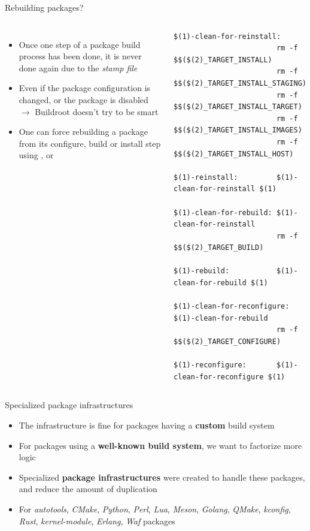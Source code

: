 \begin{frame}[fragile]{Rebuilding packages?}
  \begin{columns}
  \begin{itemize}
  \item Once one step of a package build process has been done, it is
    never done again due to the {\em stamp file}
  \item Even if the package configuration is changed, or the package
    is disabled $\rightarrow$ Buildroot doesn't try to be smart
  \item One can force rebuilding a package from its configure, build
    or install step using ,
     or 
  \end{itemize}
  \begin{block}{}
\begin{verbatim}
$(1)-clean-for-reinstall:
                        rm -f $$($(2)_TARGET_INSTALL)
                        rm -f $$($(2)_TARGET_INSTALL_STAGING)
                        rm -f $$($(2)_TARGET_INSTALL_TARGET)
                        rm -f $$($(2)_TARGET_INSTALL_IMAGES)
                        rm -f $$($(2)_TARGET_INSTALL_HOST)

$(1)-reinstall:         $(1)-clean-for-reinstall $(1)

$(1)-clean-for-rebuild: $(1)-clean-for-reinstall
                        rm -f $$($(2)_TARGET_BUILD)

$(1)-rebuild:           $(1)-clean-for-rebuild $(1)

$(1)-clean-for-reconfigure: $(1)-clean-for-rebuild
                        rm -f $$($(2)_TARGET_CONFIGURE)

$(1)-reconfigure:       $(1)-clean-for-reconfigure $(1)
\end{verbatim}
  \end{block}
  \end{columns}
\end{frame}

\begin{frame}{Specialized package infrastructures}
  \begin{itemize}
  \item The  infrastructure is fine for packages
    having a {\bf custom} build system
  \item For packages using a {\bf well-known build system}, we want
    to factorize more logic
  \item Specialized {\bf package infrastructures} were created to
    handle these packages, and reduce the amount of duplication
  \item For {\em autotools}, {\em CMake}, {\em Python}, {\em Perl},
    {\em Lua}, {\em Meson}, {\em Golang}, {\em QMake}, {\em kconfig},
    {\em Rust}, {\em kernel-module}, {\em Erlang}, {\em Waf}
    packages
  \end{itemize}
\end{frame}

